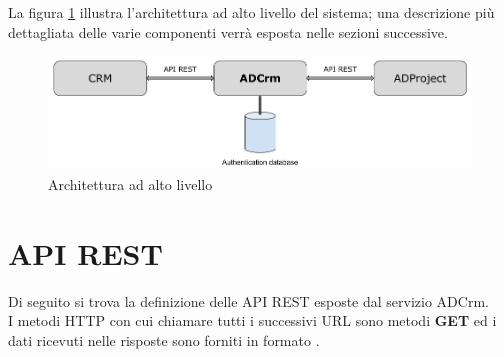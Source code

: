 La figura \ref{fig:architetturasistema} illustra l'architettura ad alto livello del sistema; una descrizione più dettagliata delle varie componenti verrà esposta nelle sezioni successive.

\begin{figure}[H]
	\centering
	\includegraphics[width=\linewidth]{images/architettura_sistema}
	\caption{Architettura ad alto livello}
	\label{fig:architetturasistema}
\end{figure}

\section{API REST}\label{apiRest}
Di seguito si trova la definizione delle API REST esposte dal servizio ADCrm.\\
I metodi HTTP con cui chiamare tutti i successivi URL sono metodi \textbf{GET} ed i dati ricevuti nelle risposte sono forniti in formato .

